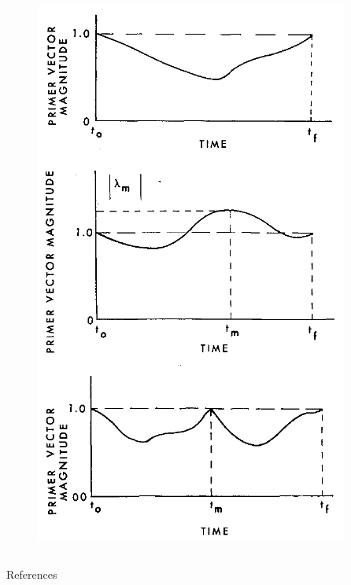 \documentclass{beamer}
\begin{document}
\begin{frame}
\begin{columns}
\begin{column}{0.3\linewidth}
\begin{figure}[htbp]
                \includegraphics[width=\linewidth]{img/primer_vector_history_from_jezewsky.png}
            \end{figure}
        \end{column}
    \end{columns}      
\end{frame}

\begin{frame}[allowframebreaks]{References}
    
    
\end{frame}
\end{document}
